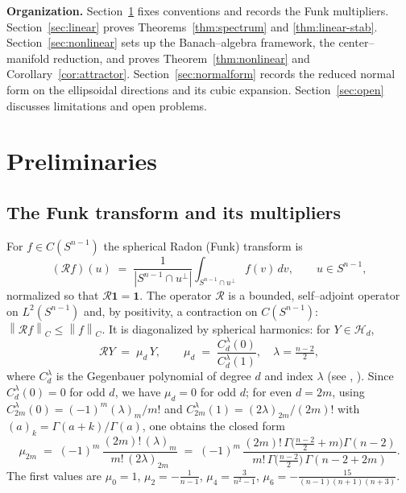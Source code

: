 \documentclass[10pt,a4paper]{amsart}
\newcommand{\Sph}{S^{n-1}}
\newcommand{\Rad}{\mathcal{R}}
\newcommand{\Hd}[1]{\mathcal{H}_{#1}}
\newcommand{\norm}[1]{\left\lVert #1 \right\rVert}
\newcommand{\abs}[1]{\left\lvert #1 \right\rvert}
\begin{document}
\medskip
\noindent\textbf{Organization.} Section~\ref{sec:prelim} fixes conventions and
records the Funk multipliers. Section~\ref{sec:linear} proves
Theorems~\ref{thm:spectrum} and \ref{thm:linear-stab}.
Section~\ref{sec:nonlinear} sets up the Banach--algebra framework, the
center--manifold reduction, and proves Theorem~\ref{thm:nonlinear} and
Corollary~\ref{cor:attractor}. Section~\ref{sec:normalform} records the reduced
normal form on the ellipsoidal directions and its cubic expansion.
Section~\ref{sec:open} discusses limitations and open problems.

\section{Preliminaries}\label{sec:prelim}

\subsection{The Funk transform and its multipliers}
For $f\in C(\Sph)$ the spherical Radon (Funk) transform is
\[
   (\Rad f)(u)\;=\;\frac{1}{\abs{\Sph\cap u^{\perp}}}
   \int_{\Sph\cap u^{\perp}} f(v)\,dv,\qquad u\in\Sph,
\]
normalized so that $\Rad\mathbf 1=\mathbf 1$. The operator $\Rad$ is a bounded,
self--adjoint operator on $L^2(\Sph)$ and, by positivity, a contraction on
$C(\Sph)$: $\norm{\Rad f}_{C}\le\norm{f}_{C}$. It is diagonalized by spherical
harmonics: for $Y\in\Hd d$,
\begin{equation}\label{eq:funk-eig}
   \Rad Y \;=\; \mu_d\, Y,\qquad
   \mu_d \;=\; \frac{C_d^{\lambda}(0)}{C_d^{\lambda}(1)},\quad \lambda=\tfrac{n-2}{2},
\end{equation}
where $C_d^{\lambda}$ is the Gegenbauer polynomial of degree $d$ and index
$\lambda$ (see \cite[Ch.~3]{Koldobsky2005}, \cite{Rubin2002}). Since
$C_d^\lambda(0)=0$ for odd $d$, we have $\mu_d=0$ for odd $d$; for even
$d=2m$, using $C_{2m}^\lambda(0)=(-1)^m (\lambda)_m/m!$ and
$C_{2m}^\lambda(1)=(2\lambda)_{2m}/(2m)!$ with $(a)_k=\Gamma(a+k)/\Gamma(a)$,
one obtains the closed form
\begin{equation}\label{eq:mu2m}
   \mu_{2m}\;=\;(-1)^m\,\frac{(2m)!\,(\lambda)_m}{m!\,(2\lambda)_{2m}}
   \;=\;(-1)^m\,\frac{(2m)!\,\Gamma\!\big(\tfrac{n-2}{2}+m\big)\Gamma(n-2)}
   {m!\,\Gamma\!\big(\tfrac{n-2}{2}\big)\,\Gamma(n-2+2m)} .
\end{equation}
The first values are $\mu_0=1$, $\mu_2=-\tfrac{1}{n-1}$,
$\mu_4=\tfrac{3}{n^2-1}$, $\mu_6=-\tfrac{15}{(n-1)(n+1)(n+3)}$.
\end{document}
